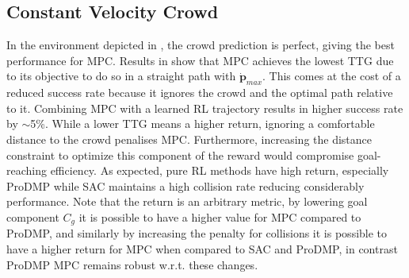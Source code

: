 \documentclass[letterpaper,conference,10pt]{IEEEconf}
\begin{document}
\subsection{Constant Velocity Crowd}

In the environment depicted in , the crowd prediction is perfect, giving the best performance for MPC. Results in  show that MPC achieves the lowest TTG due to its objective to do so in a straight path with $\dot{\boldsymbol{p}}_{max}$. This comes at the cost of a reduced success rate because it ignores the crowd and the optimal path relative to it. Combining MPC with a learned RL trajectory results in higher success rate by $\sim$5\%. While a lower TTG means a higher return, ignoring a comfortable distance to the crowd penalises MPC. Furthermore, increasing the distance constraint to optimize this component of the reward would compromise goal-reaching efficiency. As expected, pure RL methods have high return, especially ProDMP while SAC maintains a high collision rate reducing considerably performance. Note that the return is an arbitrary metric, by lowering goal component $C_g$ it is possible to have a higher value for MPC compared to ProDMP, and similarly by increasing the penalty for collisions it is possible to have a higher return for MPC when compared to SAC and ProDMP, in contrast ProDMP MPC remains robust w.r.t. these changes.
\end{document}

